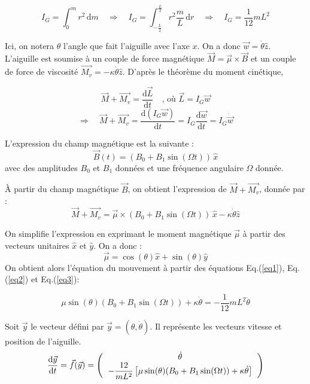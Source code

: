 \documentclass[a4paper,12pt,twoside]{article}
\begin{document}
\begin{equation}
    I_G = \int^m_0 r^2\,\text{d}m \quad \Rightarrow \quad I_G = \int^{\frac{L}{2}}_{-\frac{L}{2}} r^2\frac{m}{L}\,\text{d}r \quad \Rightarrow \quad I_G = \displaystyle\frac{1}{12}mL^2
    \label{eq1}
\end{equation}

Ici, on notera $\theta$ l'angle que fait l'aiguille avec l'axe $x$. On a donc $\vec{w}=\dot{\theta}\hat{z}$.
L'aiguille est soumise à un couple de force magnétique $\vec{M}=\vec{\mu}\times\vec{B}$ et un couple de force de viscosité $\vec{M_v}=-\kappa\dot{\theta}\hat{z}$. D'après le théorème du moment cinétique,

\[
\vec{M}+\vec{M_v} = \displaystyle\frac{\text{d}\vec{L}}{\text{d}t} \quad\text{, où } \vec{L} = I_G\vec{w} 
\]
\begin{equation}
\Rightarrow \quad\vec{M}+\vec{M_v} = \displaystyle\frac{\text{d}(I_G\vec{w})}{\text{d}t}=I_G\displaystyle\frac{\text{d}\vec{w}}{\text{d}t}=I_G\dot{\vec{w}}
\label{eq2}
\end{equation}

L'expression du champ magnétique est la suivante :\\
\[
\vec{B}(t)= (B_0+B_1\sin(\Omega t))\,\hat{x}
\]
\noindent avec des amplitudes $B_0$ et $B_1$ données et une fréquence angulaire $\Omega$ donnée.

À partir du champ magnétique $\vec{B}$, on obtient l'expression de $\vec{M} +\vec{M_v}$, donnée par :\\
\begin{equation}
\vec{M}+\vec{M_v} = \vec{\mu}\times(B_0+B_1\sin(\Omega t))\,\hat{x} -\kappa\dot{\theta}\hat{z}
\label{eq3}
\end{equation}

On simplifie l'expression en exprimant le moment magnétique $\vec{\mu}$ à partir des vecteurs unitaires $\hat{x}$ et $\hat{y}$. On a donc : 
\[
\vec{\mu} = \cos(\theta)\hat{x} + \sin(\theta)\hat{y}
\]
On obtient alors l'équation du mouvement à partir des équations Eq.(\ref{eq1}), Eq.(\ref{eq2}) et Eq.(\ref{eq3}):

\begin{equation}
    \mu\sin(\theta)(B_0+B_1\sin(\Omega t)) + \kappa\dot{\theta} = -\displaystyle\frac{1}{12}mL^2\ddot{\theta}
    \label{eq4}
\end{equation}

Soit $\vec{y}$ le vecteur défini par $\vec{y} = (\theta,\dot{\theta})$. Il représente les vecteurs vitesse et position de l'aiguille.
\begin{equation}
\displaystyle\frac{\text{d}\vec{y}}{\text{d}t} = \vec{f}(\vec{y}) = \left(
\begin{tabular}{c}
     $\dot{\theta}$ \\
     $-\displaystyle\frac{12}{mL^2}\left[\mu \sin(\theta)(B_0+B_1\sin(\Omega t)) +\kappa\dot{\theta}\right]$
\end{tabular}
\right)
\end{equation}
\end{document}
